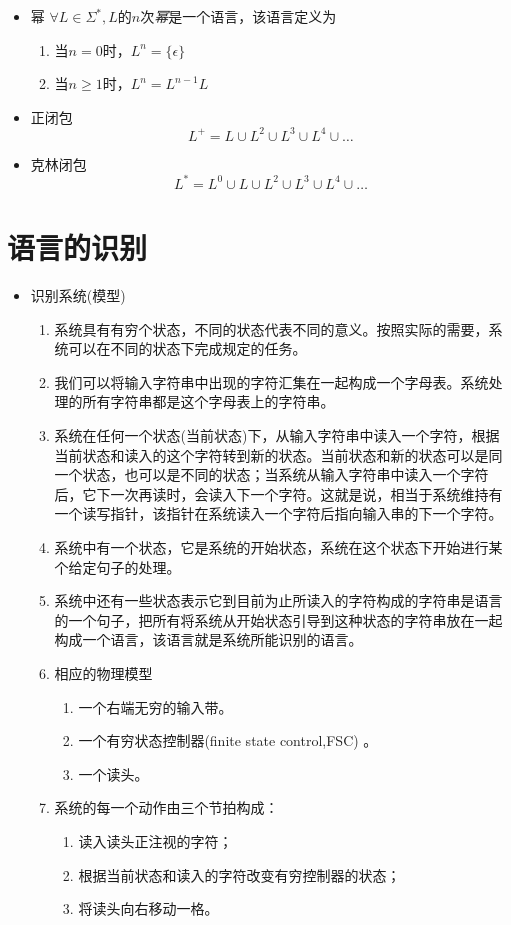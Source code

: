 \begin{itemize}
	\item 幂
	$\forall L\in\Sigma^{\ast},L$的$n$次\emph{幂}是一个语言，该语言定义为
	\begin{enumerate}
		\item 当$n=0$时，$L^n=\{\epsilon\}$
		\item 当$n\ge 1$时，$L^n=L^{n-1}L$
	\end{enumerate}
	\item 正闭包
	\[L^+=L\cup L^2\cup L^3\cup L^4 \cup\dots\]
	\item 克林闭包
	\[L^{\ast}=L^0\cup L\cup L^2\cup L^3\cup L^4 \cup\dots\]
\end{itemize}

\section{语言的识别}
\begin{itemize}
	\item 识别系统(模型)
	\begin{enumerate}
		\item 系统具有有穷个状态，不同的状态代表不同的意义。按照实际的需要，系统可以在不同的状态下完成规定的任务。
		\item 我们可以将输入字符串中出现的字符汇集在一起构成一个字母表。系统处理的所有字符串都是这个字母表上的字符串。 
		\item 系统在任何一个状态(当前状态)下，从输入字符串中读入一个字符，根据当前状态和读入的这个字符转到新的状态。当前状态和新的状态可以是同一个状态，也可以是不同的状态；当系统从输入字符串中读入一个字符后，它下一次再读时，会读入下一个字符。这就是说，相当于系统维持有一个读写指针，该指针在系统读入一个字符后指向输入串的下一个字符。
		\item 系统中有一个状态，它是系统的开始状态，系统在这个状态下开始进行某个给定句子的处理。 
		\item 系统中还有一些状态表示它到目前为止所读入的字符构成的字符串是语言的一个句子，把所有将系统从开始状态引导到这种状态的字符串放在一起构成一个语言，该语言就是系统所能识别的语言。\item 相应的物理模型
		\begin{enumerate}
			\item 一个右端无穷的输入带。
			\item 一个有穷状态控制器(finite state control,FSC) 。
			\item 一个读头。
		\end{enumerate}
	   \item 系统的每一个动作由三个节拍构成：
	   \begin{enumerate}
	   		\item 读入读头正注视的字符；
	   		\item 根据当前状态和读入的字符改变有穷控制器的状态；
	   		\item 将读头向右移动一格。
	   \end{enumerate}    	
	\end{enumerate}
\end{itemize}
